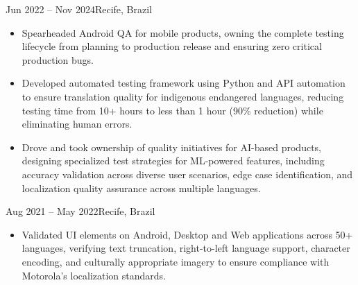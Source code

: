 \documentclass[10pt,a4paper,ragged2e]{altacv}
\begin{document}
    \divider

     {Jun 2022 -- Nov 2024}{Recife, Brazil}
    \begin{itemize}
      \item Spearheaded Android QA for mobile products, owning the complete testing lifecycle from planning to production release and ensuring zero critical production bugs.
      \item Developed automated testing framework using Python and API automation to ensure translation quality for indigenous endangered languages, reducing testing time from 10+ hours to less than 1 hour (90\% reduction) while eliminating human errors.
      \item Drove and took ownership of quality initiatives for AI-based products, designing specialized test strategies for ML-powered features, including accuracy validation across diverse user scenarios, edge case identification, and localization quality assurance across multiple languages.
    \end{itemize}

    \divider

     {Aug 2021 -- May 2022}{Recife, Brazil}
    \begin{itemize} 
      \item Validated UI elements on Android, Desktop and Web applications across 50+ languages, verifying text truncation, right-to-left language support, character encoding, and culturally appropriate imagery to ensure compliance with Motorola's localization standards.
    \end{itemize}







\end{document}
